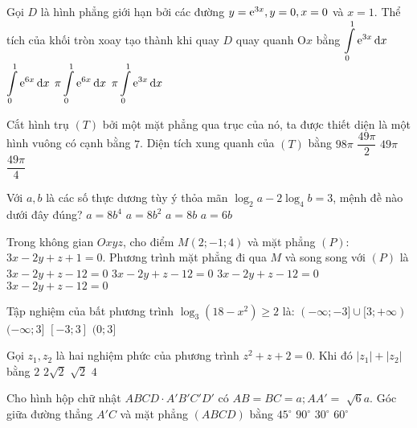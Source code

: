 \begin{ex}%
Gọi $D$ là hình phẳng giới hạn bởi các đường $y={\rm e}^{3 x}, y=0, x=0$ và $x=1$. Thể tích của khối tròn xoay tạo thành khi quay $D$ quay quanh $\mathrm{O} x$ bằng
\choice
{$\displaystyle\int\limits_0^1 {\rm e}^{3 x}\mathrm{\,d}x$}
{$\displaystyle\int\limits_0^1 {\rm e}^{6 x}\mathrm{\,d}x$}
{\True $\pi \displaystyle\int\limits_0^1 {\rm e}^{6 x}\mathrm{\,d}x$}
{$\pi \displaystyle\int\limits_0^1 {\rm e}^{3 x}\mathrm{\,d}x$}

\end{ex}
\begin{ex}%
Cắt hình trụ $(T)$ bởi một mặt phẳng qua trục của nó, ta được thiết diện là một hình vuông có cạnh bằng $7$. Diện tích xung quanh của $(T)$ bằng
\choice
{$98\pi$}
{$\dfrac{49\pi}{2}$}
{\True $49\pi$}
{$\dfrac{49\pi}{4}$}

\end{ex}
\begin{ex}%
Với $a, b$ là các số thực dương tùy ý thỏa mãn $\log_2 a-2\log_4 b=3$, mệnh đề nào dưới đây đúng?
\choice
{$a=8 b^4$}
{$a=8 b^2$}
{\True $a=8 b$}
{$a=6 b$}

\end{ex}
\begin{ex}%
Trong không gian $O x y z$, cho điểm $M(2;-1; 4)$ và mặt phẳng $(P)$: $3 x-2 y+z+1=0$. Phương trình mặt phẳng đi qua $M$ và song song với $(P)$ là
\choice
{\True $3 x-2 y+z-12=0$}
{$3 x-2 y+z-12=0$}
{$3 x-2 y+z-12=0$}
{$3 x-2 y+z-12=0$}

\end{ex}
\begin{ex}%
Tập nghiệm của bất phương trình $\log_3\left(18-x^2\right) \geq 2$ là:
\choice
{$(-\infty;-3] \cup[3;+\infty)$}
{$(-\infty; 3]$}
{\True $[-3; 3]$}
{$(0; 3]$}

\end{ex}
\begin{ex}%
Gọi $z_1, z_2$ là hai nghiệm phức của phương trình $z^2+z+2=0$. Khi đó $\left|z_1\right|+\left|z_2\right|$ bằng
\choice
{$2$}
{\True $2\sqrt{2}$}
{$\sqrt{2}$}
{$4$}

\end{ex}
\begin{ex}%
Cho hình hộp chữ nhật $ABCD \cdot A'B'C'D'$ có $AB=BC=a; AA'=$ $\sqrt{6} a$. Góc giữa đường thẳng $A'C$ và mặt phẳng $(ABCD)$ bằng
\choice
{$45^{\circ}$}
{$90^{\circ}$}
{$30^{\circ}$}
{\True $60^{\circ}$}

\end{ex}
